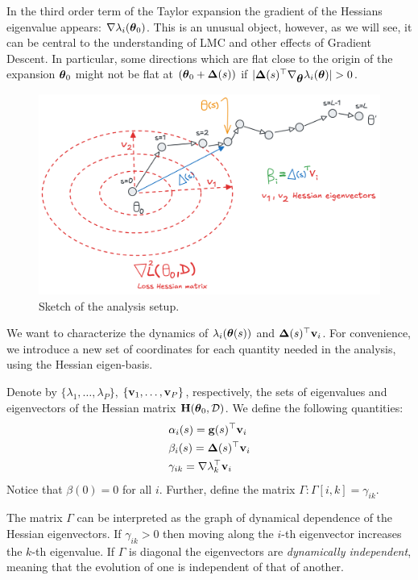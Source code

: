 \documentclass{article} %
\newcommand{\hessian}{\vH}
\begin{document}
\begin{remark} In the third order term of the Taylor expansion the gradient of the Hessians eigenvalue appears: $\nabla\lambda_i(\mbox{$\mbox{$\boldsymbol{\theta}$}$}_0)$. This is an unusual object, however, as we will see, it can be central to the understanding of LMC and other effects of Gradient Descent. In particular, some directions which are flat close to the origin of the expansion $\mbox{$\mbox{$\boldsymbol{\theta}$}$}_0$ might not be flat at $(\mbox{$\mbox{$\boldsymbol{\theta}$}$}_0 + \mbox{$\mbox{$\boldsymbol{\Delta}$}$}(s))$ if $|\mbox{$\mbox{$\boldsymbol{\Delta}$}$}(s)^\top\nabla_{\mbox{$\mbox{$\boldsymbol{\theta}$}$}}\lambda_i(\mbox{$\mbox{$\boldsymbol{\theta}$}$})| > 0$.
\end{remark}

\begin{figure}
    \centering
    \includegraphics[width=0.8\linewidth]{figures/sketch_dynamics.png}
    \caption{Sketch of the analysis setup.}
    \label{fig:sketch-analysis}
\end{figure}


We want to characterize the dynamics of $\lambda_i(\mbox{$\mbox{$\boldsymbol{\theta}$}$}(s))$ and $ \mbox{$\mbox{$\boldsymbol{\Delta}$}$}(s)^\top \mbox{$\mbox{$\mathbf{v}$}$}_i$. For convenience, we introduce a new set of coordinates for each quantity needed in the analysis, using the Hessian eigen-basis.

\begin{defn}
\label{def:alpha-beta-gamma}
    Denote by $\{\lambda_1, \dots, \lambda_P\}$, $\{\mbox{$\mbox{$\mathbf{v}$}$}_1, \dots, \mbox{$\mbox{$\mathbf{v}$}$}_P\}$, respectively, the sets of eigenvalues and eigenvectors of the Hessian matrix $\hessian(\vparam_0,\data)$. 
    We define the following quantities: 
    \begin{align}
        &\alpha_i(s) = \mbox{$\mbox{$\mathbf{g}$}$}(s)^\top \mbox{$\mbox{$\mathbf{v}$}$}_i\\
        &\beta_i(s) = \mbox{$\mbox{$\boldsymbol{\Delta}$}$}(s)^\top \mbox{$\mbox{$\mathbf{v}$}$}_i\\
        &\gamma_{ik} = \nabla\lambda_k ^\top \mbox{$\mbox{$\mathbf{v}$}$}_i
    \end{align}
    Notice that $\beta(0)=0$ for all $i$.  Further, define the matrix $\Gamma: \Gamma[i,k] = \gamma_{ik}$.
\end{defn}
The matrix $\Gamma$ can be interpreted as the graph of dynamical dependence of the Hessian eigenvectors. If $\gamma_{ik} > 0$ then moving along the $i$-th eigenvector increases the $k$-th eigenvalue. If $\Gamma$ is diagonal the eigenvectors are \emph{dynamically independent}, meaning that the evolution of one is independent of that of another. 
\end{document}

